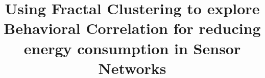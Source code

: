 \documentclass{acm_proc_article-sp}
\begin{document}
%

\title{Using Fractal Clustering to explore Behavioral Correlation for
reducing energy consumption in Sensor Networks}



\maketitle
\end{document}
